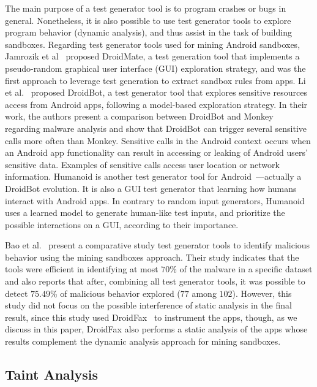 The main purpose of a test generator tool is to program crashes or bugs in general. Nonetheless, it is also possible to use test generator tools to explore program behavior (dynamic analysis), and thus assist in the task of building sandboxes. Regarding test generator tools used for mining Android sandboxes, Jamrozik et al~\cite{DBLP:conf/icse/JamrozikZ16} proposed DroidMate, a test generation tool that implements a pseudo-random graphical user interface (GUI) exploration strategy, and was the first approach to leverage test generation to extract sandbox rules from apps. Li et al.~\cite{DBLP:conf/icse/LiYGC17} proposed DroidBot, a test generator tool that explores sensitive resources access from Android apps, following a model-based exploration strategy. In their work, the authors present a comparison between DroidBot and Monkey~\cite{Monkey} regarding malware analysis and show that DroidBot can trigger several sensitive calls more often than Monkey. Sensitive calls in the Android context occurs when an Android app functionality can result in accessing or leaking of Android users' sensitive data. Examples of sensitive calls access user location or network information. Humanoid is another test generator tool for Android~\cite{DBLP:conf/kbse/LiY0C19}---actually a DroidBot evolution. It is also a GUI test generator that learning how humans interact with Android apps. In contrary to random input generators, Humanoid uses a learned model to generate human-like test inputs, and prioritize the possible interactions on a GUI, according to their importance.


Bao et al.~\cite{DBLP:conf/wcre/BaoLL18} present a comparative study test generator tools to identify malicious behavior using the mining sandboxes approach. Their study indicates that the tools were efficient in identifying at most $70$\% of the malware in a specific dataset and also reports that after, combining all test generator tools, it was possible to detect $75.49$\% of malicious behavior explored ($77$ among $102$). However, this study did not focus on the possible interference of static analysis in the final result, since this study used DroidFax~\cite{DBLP:conf/icsm/CaiR17a} to instrument the apps, though, as we discuss in this paper, DroidFax also performs a static analysis of the apps whose results complement the dynamic analysis approach for mining sandboxes.

\subsection{Taint Analysis}\label{sec:taint}

